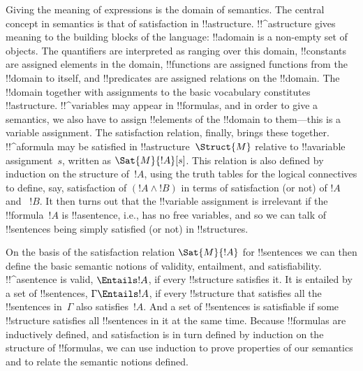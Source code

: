 \documentclass[../../../include/open-logic-section]{subfiles}
\begin{document}


Giving the meaning of expressions is the domain of semantics.  The
central concept in semantics is that of satisfaction in
!!a{structure}. !!^a{structure} gives meaning to the building blocks
of the language: !!a{domain} is a non-empty set of objects. The
quantifiers are interpreted as ranging over this domain, !!{constant}s
are assigned elements in the domain, !!{function}s are assigned
functions from the !!{domain} to itself, and !!{predicate}s are
assigned relations on the !!{domain}.  The !!{domain} together with
assignments to the basic vocabulary constitutes !!a{structure}.
!!^{variable}s may appear in !!{formula}s, and in order to give a
semantics, we also have to assign !!{element}s of the !!{domain} to
them---this is a variable assignment. The satisfaction relation,
finally, brings these together. !!^a{formula} may be satisfied in
!!a{structure}~$\Struct{M}$ relative to !!a{variable} assignment~$s$,
written as $\Sat{M}{!A}[s]$. This relation is also defined by
induction on the structure of~$!A$, using the truth tables for the
logical connectives to define, say, satisfaction of $(!A \land !B)$ in
terms of satisfaction (or not) of $!A$ and ~$!B$.  It then turns out
that the !!{variable} assignment is irrelevant if the !!{formula}~$!A$
is !!a{sentence}, i.e., has no free variables, and so we can talk of
!!{sentence}s being simply satisfied (or not) in !!{structure}s.

On the basis of the satisfaction relation $\Sat{M}{!A}$ for !!{sentence}s
we can then define the basic semantic notions of validity, entailment,
and satisfiability. !!^a{sentence} is valid, $\Entails !A$, if every
!!{structure} satisfies it. It is entailed by a set of !!{sentence}s,
$\Gamma \Entails !A$, if every !!{structure} that satisfies all the
!!{sentence}s in~$\Gamma$ also satisfies~$!A$. And a set of !!{sentence}s
is satisfiable if some !!{structure} satisfies all !!{sentence}s in it
at the same time.  Because !!{formula}s are inductively defined, and
satisfaction is in turn defined by induction on the structure of
!!{formula}s, we can use induction to prove properties of our
semantics and to relate the semantic notions defined.
\end{document}

